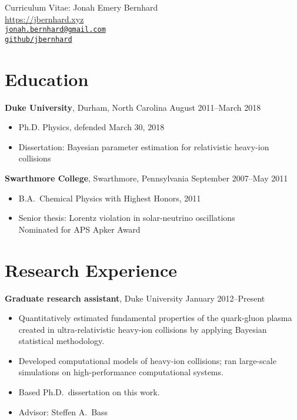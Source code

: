 \documentclass[letterpaper,10pt]{article}
\newcommand{\entry}[3]{\vspace{.5em plus .1em minus .1em}\textbf{#1}, #2 \hfill #3}
\begin{document}
\begin{center}
  \Large
  Curriculum Vitae:  Jonah Emery Bernhard \\[1ex]
  \normalsize\rm
  \url{https://jbernhard.xyz} \\
  \href{mailto:jonah.bernhard@gmail.com}{\nolinkurl{jonah.bernhard@gmail.com}} \\
  \href{https://github.com/jbernhard}{\nolinkurl{github/jbernhard}}
\end{center}


\section{Education}

\entry{Duke University}{Durham, North Carolina}{August 2011--March 2018}

\begin{itemize}
  \item Ph.D. Physics, defended March 30, 2018
  \item Dissertation: Bayesian parameter estimation for relativistic heavy-ion collisions
\end{itemize}

\entry{Swarthmore College}{Swarthmore, Pennsylvania}{September 2007--May 2011}

\begin{itemize}
  \item B.A.\ Chemical Physics with Highest Honors, 2011
  \item Senior thesis: Lorentz violation in solar-neutrino oscillations \\
    Nominated for APS Apker Award
\end{itemize}


\section{Research Experience}

\entry{Graduate research assistant}{Duke University}{January 2012--Present}

\begin{itemize}
  \item Quantitatively estimated fundamental properties of the quark-gluon plasma created in ultra-relativistic heavy-ion collisions by applying Bayesian statistical methodology.
  \item Developed computational models of heavy-ion collisions;
    ran large-scale simulations on high-performance computational systems.
  \item Based Ph.D.\ dissertation on this work.
  \item Advisor: Steffen A.\ Bass
\end{itemize}
\end{document}

